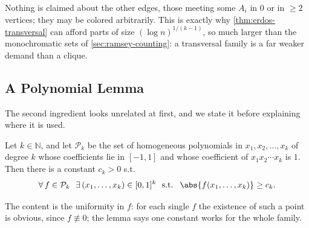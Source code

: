 \begin{remark}
    Nothing is claimed about the other edges, those meeting some \(A_i\) in \(0\) or in \(\ge 2\) vertices; they may be colored arbitrarily. This is exactly why \autoref{thm:erdos-transversal} can afford parts of size \((\log n)^{1/(k-1)}\), so much larger than the monochromatic sets of \autoref{sec:ramsey-counting}: a transversal family is a far weaker demand than a clique.
\end{remark}

\subsection{A Polynomial Lemma}

The second ingredient looks unrelated at first, and we state it before explaining where it is used.

\begin{lemma}\label{lem:polynomial}
    Let \(k \in \mathbb{N}\), and let \(\mathcal{P}_k\) be the set of homogeneous polynomials in \(x_1, x_2, \ldots, x_k\) of degree \(k\) whose coefficients lie in \([-1,1]\) and whose coefficient of \(x_1 x_2 \cdots x_k\) is \(1\). Then there is a constant \(c_k > 0\) s.t.
    \[
        \forall\, f \in \mathcal{P}_k \ \ \exists\, (x_1, \ldots, x_k) \in [0,1]^k \ \text{ s.t. } \ \abs{f(x_1, \ldots, x_k)} \ge c_k.
    \]
\end{lemma}

The content is the uniformity in \(f\): for each single \(f\) the existence of such a point is obvious, since \(f \not\equiv 0\); the lemma says one constant works for the whole family.

